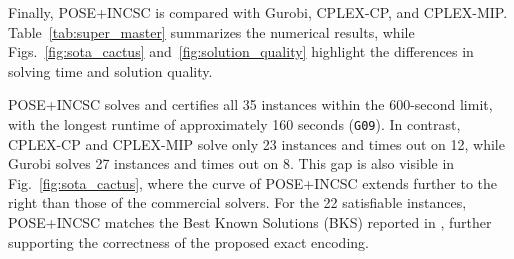 \documentclass[letterpaper,journal]{IEEEtran}
\begin{document}

Finally, POSE+INCSC is compared with Gurobi, CPLEX-CP, and CPLEX-MIP. Table~\ref{tab:super_master} summarizes the numerical results, while Figs.~\ref{fig:sota_cactus} and~\ref{fig:solution_quality} highlight the differences in solving time and solution quality. 

POSE+INCSC solves and certifies all 35 instances within the 600-second limit, with the longest runtime of approximately 160 seconds (\texttt{G09}). In contrast, CPLEX-CP and CPLEX-MIP solve only 23 instances and times out on 12, while Gurobi solves 27 instances and times out on 8. This gap is also visible in Fig.~\ref{fig:sota_cactus}, where the curve of POSE+INCSC extends further to the right than those of the commercial solvers.
For the 22 satisfiable instances, POSE+INCSC matches the Best Known Solutions (BKS) reported in \cite{Gomez2023MO}, further supporting the correctness of the proposed exact encoding.
\end{document}
